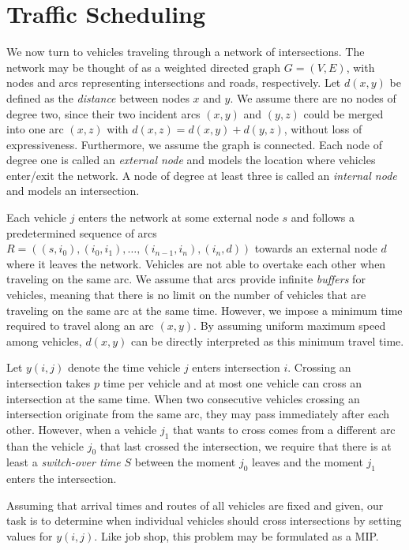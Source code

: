 \documentclass{article}
\begin{document}
\section{Traffic Scheduling}

We now turn to vehicles traveling through a network of intersections. The
network may be thought of as a weighted directed graph $G=(V,E)$, with nodes and
arcs representing intersections and roads, respectively. Let $d(x,y)$ be
defined as the \textit{distance} between nodes $x$ and $y$. We assume there are
no nodes of degree two, since their two incident arcs $(x,y)$ and $(y,z)$ could
be merged into one arc $(x,z)$ with $d(x,z) = d(x,y) + d(y,z)$, without loss of
expressiveness. Furthermore, we assume the graph is connected. Each node of
degree one is called an \textit{external node} and models the location where
vehicles enter/exit the network. A node of degree at least three is called an
\textit{internal node} and models an intersection.

Each vehicle $j$ enters the network at some external node $s$ and follows a
predetermined sequence of arcs
$R = ((s,i_{0}), (i_{0},i_{1}), \dots, (i_{n-1},i_{n}), (i_{n},d))$ towards an
external node $d$ where it leaves the network. Vehicles are not able to overtake
each other when traveling on the same arc. We assume that arcs provide
infinite \textit{buffers} for vehicles, meaning that there is no limit on the
number of vehicles that are traveling on the same arc at the same time.
However, we impose a minimum time required to travel along an arc $(x,y)$. By
assuming uniform maximum speed among vehicles, $d(x,y)$ can be directly
interpreted as this minimum travel time.

Let $y(i,j)$ denote the time vehicle $j$ enters intersection $i$. Crossing an
intersection takes $p$ time per vehicle and at most one vehicle can cross an
intersection at the same time. When two consecutive vehicles crossing an
intersection originate from the same arc, they may pass immediately after each
other. However, when a vehicle $j_{1}$ that wants to cross comes from a
different arc than the vehicle $j_{0}$ that last crossed the intersection, we
require that there is at least a \textit{switch-over time} $S$ between the
moment $j_{0}$ leaves and the moment $j_{1}$ enters the intersection.

Assuming that arrival times and routes of all vehicles are fixed and given,
our task is to determine when individual vehicles should cross intersections by
setting values for $y(i,j)$.
Like job shop, this problem may be formulated as a MIP.
\end{document}
